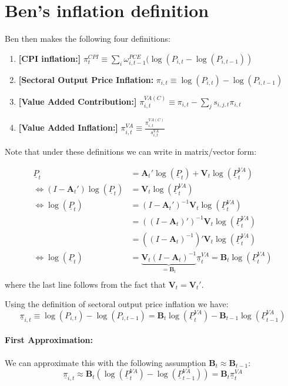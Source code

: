 \documentclass[12pt,english]{article}
\begin{document}
\section{Ben's inflation definition}

Ben then makes the following four definitions:

\begin{enumerate}
	\item {\bf [CPI inflation:]} $\pi_t^{CPI}\equiv \sum_i \omega_{i,t-1}^{PCE} (\log(P_{i,t} - \log(P_{i,t-1}))$
	\item {\bf [Sectoral Output Price Inflation:} $\pi_{i,t}\equiv \log(P_{i,t}) - \log(P_{i,t-1})$
	\item {\bf [Value Added Contribution:]} $\pi_{i,t}^{VA(C)}\equiv \pi_{i,t} - \sum_j s_{i,j,t}\pi_{i,t}$
		\item {\bf [Value Added Inflation:]} $\pi_{i,t}^{VA}\equiv \frac{\pi_{i,t}^{VA(C)}}{s_{i,t}^{VA}}$
\end{enumerate}

Note that under these definitions we can write in matrix/vector form:

\begin{align*}
	\underline{P}_{t} &=  \mathbold{A}_t' \log(\underline{P}_{t})+\mathbold{V}_t\log(\underline{P}_{t}^{VA})\\
	\Leftrightarrow (I-\mathbold{A}_t')\log(\underline{P}_{t}) &=\mathbold{V}_t\log(\underline{P}_{t}^{VA})\\
	\Leftrightarrow \log(\underline{P}_{t}) &=(I-\mathbold{A}_t')^{-1}\mathbold{V}_t\log(\underline{P}_{t}^{VA})\\
	&=((I-\mathbold{A}_t)')^{-1}\mathbold{V}_t\log(\underline{P}_{t}^{VA})\\
	&=((I-\mathbold{A}_t)^{-1})'\mathbold{V}_t\log(\underline{P}_{t}^{VA})\\
	\Leftrightarrow \log(\underline{P}_{t}) &=\underbrace{\mathbold{V}_t(I-\mathbold{A}_t)^{-1}}_{=\mathbold{B}_t}\underline{\pi}_{t}^{VA} = \mathbold{B}_t\log(\underline{P}_{t}^{VA})\\
\end{align*}
where the last line follows from the fact that $\mathbold{V}_t = \mathbold{V}_t'$.

Using the definition of sectoral output price inflation we have:
\[
	\underline{\pi}_{i,t} \equiv \log(P_{i,t}) - \log(P_{i,t-1}) = \mathbold{B}_t\log(\underline{P}_{t}^{VA}) - \mathbold{B}_{t-1}\log(\underline{P}_{t-1}^{VA})
\]

\paragraph{First Approximation:} We can approximate this with the following assumption $\mathbold{B}_t \approx \mathbold{B}_{t-1}$:
\[
	\underline{\pi}_{i,t} \approx \mathbold{B}_t(\log(\underline{P}_{t}^{VA}) - \log(\underline{P}_{t-1}^{VA})) = \mathbold{B}_t \underline{\pi}_t^{VA}
\]
\end{document}
